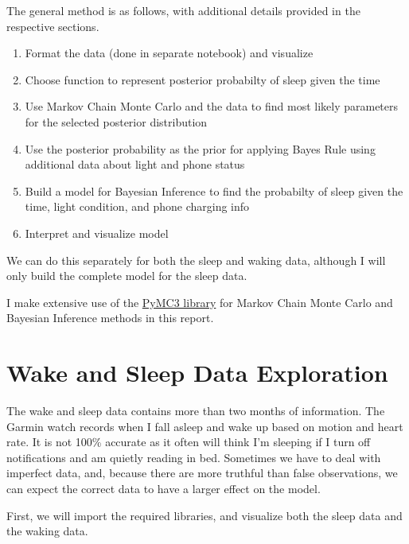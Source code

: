 \documentclass[12pt]{article}
\providecommand{\tightlist}{%
      \setlength{\itemsep}{0pt}\setlength{\parskip}{0pt}}
\begin{document}
The general method is as follows, with additional details provided in
the respective sections.

\begin{enumerate}
\def\labelenumi{\arabic{enumi}.}
\tightlist
\item
  Format the data (done in separate notebook) and visualize
\item
  Choose function to represent posterior probabilty of sleep given the
  time
\item
  Use Markov Chain Monte Carlo and the data to find most likely
  parameters for the selected posterior distribution
\item
  Use the posterior probability as the prior for applying Bayes Rule
  using additional data about light and phone status
\item
  Build a model for Bayesian Inference to find the probabilty of sleep
  given the time, light condition, and phone charging info
\item
  Interpret and visualize model
\end{enumerate}

We can do this separately for both the sleep and waking data, although I
will only build the complete model for the sleep data.

I make extensive use of the
\href{https://github.com/pymc-devs/pymc3}{PyMC3 library} for Markov
Chain Monte Carlo and Bayesian Inference methods in this report.

    \hypertarget{wake-and-sleep-data-exploration}{%
\section{Wake and Sleep Data
Exploration}\label{wake-and-sleep-data-exploration}}

The wake and sleep data contains more than two months of information.
The Garmin watch records when I fall asleep and wake up based on motion
and heart rate. It is not 100\% accurate as it often will think I'm
sleeping if I turn off notifications and am quietly reading in bed.
Sometimes we have to deal with imperfect data, and, because there are
more truthful than false observations, we can expect the correct data to
have a larger effect on the model.

First, we will import the required libraries, and visualize both the
sleep data and the waking data.
\end{document}
